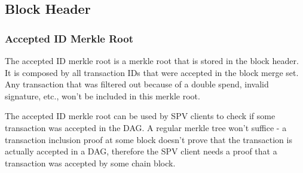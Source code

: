 \subsection{Block Header}
\subsubsection{Accepted ID Merkle Root}

The accepted ID merkle root is a merkle root that is stored in the block header. It is composed by all transaction IDs that were accepted in the block merge set. Any transaction that was filtered out because of a double spend, invalid signature, etc., won't be included in this merkle root.

The accepted ID merkle root can be used by SPV clients to check if some transaction was accepted in the DAG. A regular merkle tree won't suffice - a transaction inclusion proof at some block doesn't prove that the transaction is actually accepted in a DAG, therefore the SPV client needs a proof that a transaction was accepted by some chain block.